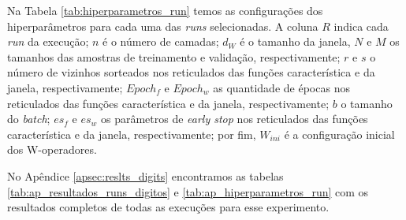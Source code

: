Na Tabela \ref{tab:hiperparametros_run} temos as configurações dos hiperparâmetros para cada uma das \textit{runs} selecionadas. A coluna $R$ indica cada \textit{run} da execução; $n$ é o número de camadas; $d_{W}$ é o tamanho da janela, $N$ e $M$ os tamanhos das amostras de treinamento e validação, respectivamente; $r$ e $s$ o número de vizinhos sorteados nos reticulados das funções característica e da janela, respectivamente; $Epoch_f$ e $Epoch_w$ as quantidade de épocas nos reticulados das funções característica e da janela, respectivamente; $b$ o tamanho do \textit{batch}; $es_f$ e $es_w$ os parâmetros de \textit{early stop} nos reticulados das funções característica e da janela, respectivamente; por fim, $W_{ini}$ é a configuração inicial dos W-operadores. 

No Apêndice \ref{apsec:reslts_digits} encontramos as tabelas \ref{tab:ap_resultados_runs_digitos} e \ref{tab:ap_hiperparametros_run} com os resultados completos de todas as execuções para esse experimento.

